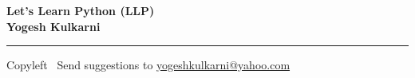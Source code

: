 
\graphicspath{{images/}}

\footnotesize


\begin{center}
\Large{\textbf{Let's Learn Python (LLP)\\ Yogesh Kulkarni}}  
\end{center}

\begin{multicols}{2}

\end{multicols}

\rule{\linewidth}{0.25pt}
\scriptsize
Copyleft \textcopyleft\  Send suggestions to 
\href{http://www.yogeshkulkarni.com}{yogeshkulkarni@yahoo.com}


